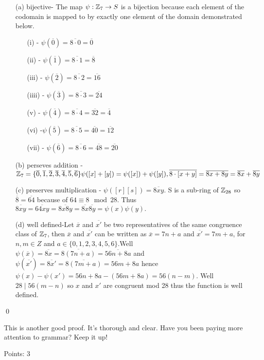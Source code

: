 \documentclass[11pt]{article}
\newcommand{\ol}[1]{\overline{#1}}
\begin{document}
\proof
{
\begin{itemize}
    \item[(a)]bijective- The map \(\psi:{\mathbb{Z}}_7 \rightarrow S\) is a bijection because each element of the codomain is mapped to by exactly one element of the domain demonstrated below.
    \begin{itemize}
        \item[(i)] - \(\psi(\ol{0}) =  \ol{8\cdot0} =\ol{0}\)
        \item[(ii)] - \(\psi(\ol{1}) = \ol{8\cdot1} =\ol{8}\)
        \item[(iii)] - \(\psi(\ol{2}) = \ol{8\cdot2} =\ol{16}\)
        \item[(iiii)] - \(\psi(\ol{3}) = \ol{8\cdot3} =\ol{24}\)
        \item[(v)] - \(\psi(\ol{4}) = \ol{8\cdot4} =\ol{32} = \ol{4}\)
        \item[(vi)] -\(\psi(\ol{5}) = \ol{8\cdot5} =\ol{40} = \ol{12}\)
        \item[(vii)] - \(\psi(\ol{6}) = \ol{8\cdot6} =\ol{48} = \ol{20}\)

    \end{itemize}


    \item[(b)] perseves addition - \(\Z_7 = \{\ol{0},\ol{1},\ol{2},\ol{3},\ol{4},\ol{5},\ol{6}\} \psi([x]+[y]) = \psi([x]) + \psi([y]), \ol{8\cdot[x+y]} =\ol{8x+8y}= \ol{8x} + \ol{8y}\)
    \item[(c)]preserves multiplication - \(\psi([r][s])= \ol{8xy}. \) S is a sub-ring of \({\mathbb{Z}}_{28}\) so  \(\ol{8} = \ol{64}\) because of \(64 \equiv 8 \mod{28}\). Thus \(\ol{8xy} = \ol{64xy} = \ol{8x8y} = \ol{8x}\ol{8y} = \psi(x)\psi(y).\)
    \item[(d)] well defined-Let \(\ol{x}\) and \(\ol{x\prime}\) be two representatives of the same congruence class of \({\mathbb{Z}}_7\), then \(\ol{x}\) and \(\ol{x\prime}\) can be written as \(\ol{x} = 7n + a \) and \(\ol{x\prime} = 7m + a \), for \(n,m \in Z\) and \(a\in \{0,1,2,3,4,5,6\}\).Well \(\psi(\ol{x}) = \ol{8x} = \ol{8(7n+a)} = \ol{56n+8a}\) and \(\psi(\ol{x\prime}) = \ol{8x\prime} = \ol{8(7m+a)} = 56m+8a\) hence \(\psi(x) - \psi(x\prime) = 56n+8a -(56m+8a) = 56(n-m).\) Well \(28 \mid 56(m-n)\) so \(x\) and \(x\prime\) are congruent mod 28 thus the function is well defined.

\end{itemize}
}
\qed

\begin{solution}
This is another good proof.  It's thorough and clear.  Have you been paying more attention to grammar?  Keep it up!

Points:  3
\end{solution}
\end{document}
